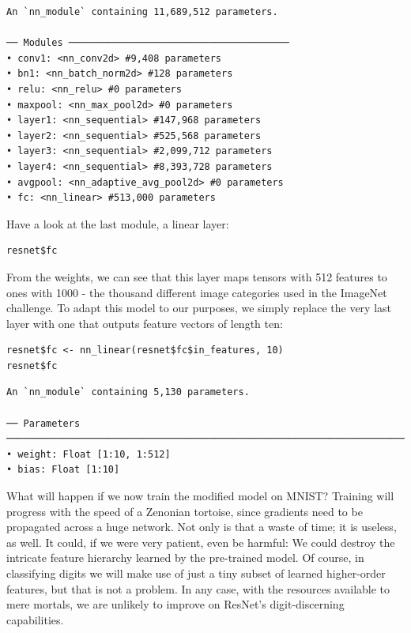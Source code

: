 \documentclass[
  letterpaper,
]{krantz}
\begin{document}
\begin{verbatim}
An `nn_module` containing 11,689,512 parameters.

── Modules ───────────────────────────────────────
• conv1: <nn_conv2d> #9,408 parameters
• bn1: <nn_batch_norm2d> #128 parameters
• relu: <nn_relu> #0 parameters
• maxpool: <nn_max_pool2d> #0 parameters
• layer1: <nn_sequential> #147,968 parameters
• layer2: <nn_sequential> #525,568 parameters
• layer3: <nn_sequential> #2,099,712 parameters
• layer4: <nn_sequential> #8,393,728 parameters
• avgpool: <nn_adaptive_avg_pool2d> #0 parameters
• fc: <nn_linear> #513,000 parameters
\end{verbatim}

Have a look at the last module, a linear layer:

\begin{verbatim}
resnet$fc
\end{verbatim}

From the weights, we can see that this layer maps tensors with 512
features to ones with 1000 - the thousand different image categories
used in the ImageNet challenge. To adapt this model to our purposes, we
simply replace the very last layer with one that outputs feature vectors
of length ten:

\begin{verbatim}
resnet$fc <- nn_linear(resnet$fc$in_features, 10)
resnet$fc
\end{verbatim}

\begin{verbatim}
An `nn_module` containing 5,130 parameters.

── Parameters ───────────────────────────────────────────────────────────────────────────────────────────────
• weight: Float [1:10, 1:512]
• bias: Float [1:10]
\end{verbatim}

What will happen if we now train the modified model on MNIST? Training
will progress with the speed of a Zenonian tortoise, since gradients
need to be propagated across a huge network. Not only is that a waste of
time; it is useless, as well. It could, if we were very patient, even be
harmful: We could destroy the intricate feature hierarchy learned by the
pre-trained model. Of course, in classifying digits we will make use of
just a tiny subset of learned higher-order features, but that is not a
problem. In any case, with the resources available to mere mortals, we
are unlikely to improve on ResNet's digit-discerning capabilities.
\end{document}
